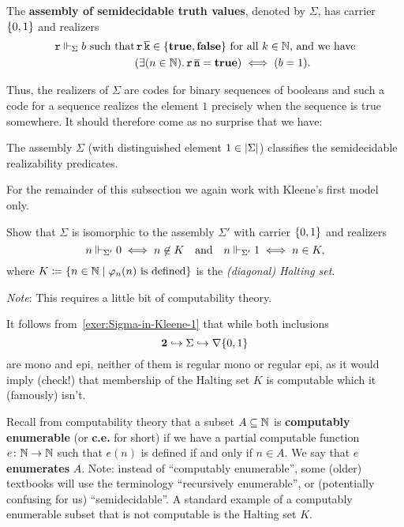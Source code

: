 \begin{definition}
  The \textbf{assembly of semidecidable truth values}, denoted by \(\Sigma\),
  has carrier \(\{0,1\}\) and realizers
  \begin{align*}
    \pca{r} \realizes_\Sigma b \text{ such that}
    &\pca{r}\numeral{k} \in \set{\pcatrue,\pcafalse}
    \text{ for all \(k \in \Nat\), and we have} \\
    &\pa*{\exists(n \in \Nat).\pca{r}\numeral{n} = \pcatrue} \iff (b = 1).
  \end{align*}
\end{definition}

Thus, the realizers of \(\Sigma\) are codes for binary sequences of booleans and
such a code for a sequence realizes the element \(1\) precisely when the
sequence is true somewhere.
%
It should therefore come as no surprise that we have:
\begin{exercise}\label{exer:Sigma-classifies-semidecidable-realizability-predicates}
  The assembly \(\Sigma\) (with distinguished element
  \(1 \in \lvert\Sigma\rvert\)) classifies the semidecidable realizability
  predicates.
\end{exercise}

For the remainder of this subsection we again work with Kleene's first model only.

\begin{exercise}\label{exer:Sigma-in-Kleene-1}
  Show that \(\Sigma\) is isomorphic to the assembly \(\Sigma'\) with carrier
  \(\{0,1\}\) and realizers
  \[
    n \Vdash_{\Sigma'} 0 \iff n \not\in K
    \quad\text{and}\quad
    n \Vdash_{\Sigma'} 1 \iff n \in K,
  \]
  where \(K \coloneqq \{n \in \mathbb N \mid \varphi_{n}(n) \text{ is defined}\}\)
  is the \emph{(diagonal) Halting set}.

  \emph{Note}: This requires a little bit of computability theory.
\end{exercise}

It follows from~\cref{exer:Sigma-in-Kleene-1} that while both inclusions
\[
  \mathbf 2 \hookrightarrow \Sigma \hookrightarrow \nabla\{0,1\}
\]
are mono and epi, neither of them is regular mono or regular epi, as it would
imply (check!) that membership of the Halting set \(K\) is computable which it
(famously) isn't.

Recall from computability theory that a subset \(A \subseteq \mathbb N\) is
\textbf{computably enumerable} (or \textbf{c.e.} for short) if we have a partial
computable function \(e \colon \mathbb N \to \mathbb N\) such that \(e(n)\) is defined if
and only if \(n \in A\).
%
We say that \(e\) \textbf{enumerates} \(A\).
%
Note: instead of ``computably enumerable'', some (older) textbooks will use the terminology
``recursively enumerable'', or (potentially confusing for us) ``semidecidable''.
%
A standard example of a computably enumerable subset that is not computable is
the Halting set \(K\).


